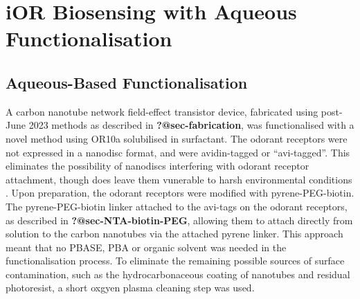 \documentclass[
  a4paper,
]{scrbook}
\begin{document}
\hypertarget{ior-biosensing-with-aqueous-functionalisation}{%
\section{iOR Biosensing with Aqueous
Functionalisation}\label{ior-biosensing-with-aqueous-functionalisation}}

\hypertarget{aqueous-based-functionalisation}{%
\subsection{Aqueous-Based
Functionalisation}\label{aqueous-based-functionalisation}}

A carbon nanotube network field-effect transistor device, fabricated
using post-June 2023 methods as described in \textbf{?@sec-fabrication},
was functionalised with a novel method using OR10a solubilised in
surfactant. The odorant receptors were not expressed in a nanodisc
format, and were avidin-tagged or ``avi-tagged''. This eliminates the
possibility of nanodiscs interfering with odorant receptor attachment,
though does leave them vunerable to harsh environmental conditions
\autocite{Nath2007,Bayburt2010}. Upon preparation, the odorant receptors
were modified with pyrene-PEG-biotin. The pyrene-PEG-biotin linker
attached to the avi-tags on the odorant receptors, as described in
\textbf{?@sec-NTA-biotin-PEG}, allowing them to attach directly from
solution to the carbon nanotubes via the attached pyrene linker. This
approach meant that no PBASE, PBA or organic solvent was needed in the
functionalisation process. To eliminate the remaining possible sources
of surface contamination, such as the hydrocarbonaceous coating of
nanotubes and residual photoresist, a short oxgyen plasma cleaning step
was used.
\end{document}
